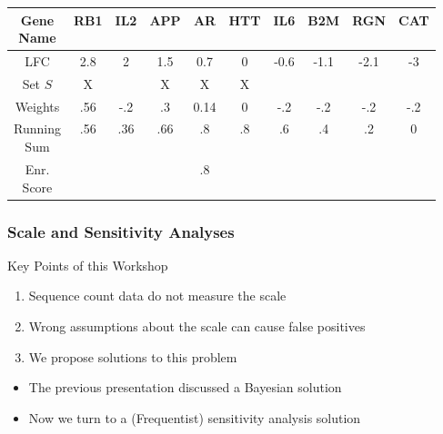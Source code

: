     \begin{tabular}{| c | c | c | c | c | c | c | c | c | c |}
      \hline
      \makecell{Gene \\Name} & RB1 & IL2 & APP & AR & HTT & IL6 & B2M & RGN & CAT \\
      \hline
      LFC & 2.8 & 2 & 1.5 & 0.7 & 0 & -0.6 & -1.1 & -2.1 & -3 \\
      \hline
      Set \(S\) & X & & X & X & X & & & & \\
      \hline
      Weights & .56 & -.2 & .3 & 0.14 & 0 & -.2 & -.2 & -.2 & -.2 \\
      \hline
      \makecell{Running \\ Sum} & .56 & .36 & .66 & .8 & .8 & .6 & .4 & .2 & 0 \\
      \hline
      \makecell{Enr. \\ Score} & & & & .8 & & & & & \\
      \hline
    \end{tabular}
\begin{frame}
  \frametitle{Scale and Sensitivity Analyses}

  \begin{exampleblock}{Key Points of this Workshop}
    \begin{enumerate}
      \item Sequence count data do not measure the scale
      \item Wrong assumptions about the scale can cause false positives
      \item We propose solutions to this problem
    \end{enumerate}
  \end{exampleblock}

  \begin{itemize}
    \item The previous presentation discussed a Bayesian solution
    \item Now we turn to a (Frequentist) sensitivity analysis solution
  \end{itemize}
\end{frame}
